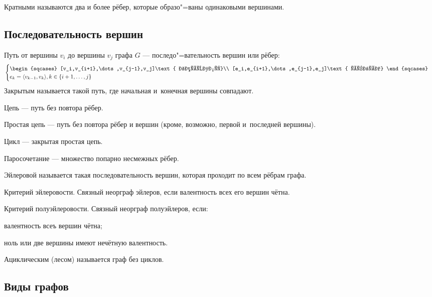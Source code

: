 {\bold Кратными} называются два и более рёбер, которые образо"=ваны {\ital одинаковыми} вершинами.

\subsection{Последовательность вершин}

{\bold Путь} от вершины $v_i$ до вершины $v_j$ графа $G$ --- последо"=вательность вершин или рёбер:
$$\begin{cases}
\begin{sqcases}
[v_i,v_{i+1},\dots,v_{j-1},v_j]\text{ вершины}\\
[e_i,e_{i+1},\dots,e_{j-1},e_j]\text{ рёбра}
\end{sqcases}\\
e_k=\langle v_{k-1},v_k\rangle,k\in\{i+1,\dots,j\}
\end{cases}$$
{\bold Закрытым} называется такой путь, где начальная и~конечная вершины совпадают.

{\bold Цепь} --- путь без повтора рёбер.

{\bold Простая цепь} --- путь без повтора рёбер и вершин {\ital\color{desc} (кроме, возможно, первой и~последней вершины)}.

{\bold Цикл} --- закрытая простая цепь.

{\bold Паросочетание} --- множество попарно несмежных рёбер.

{\bold Эйлеровой} называется такая последовательность вершин, которая проходит по всем {\ital рёбрам} графа.
\begin{theorem}
{\bold Критерий эйлеровости.} Связный неорграф {\ital эйлеров}, если валентность всех его вершин чётна. 
\end{theorem}
\begin{theorem}
{\bold Критерий полуэйлеровости.} Связный неорграф {\ital полуэйлеров}, если:

\begin{list*}
\item валентность всеъ вершин {\ital чётна};
\item ноль или две вершины имеют {\ital нечётную} валентность.
\end{list*}
\end{theorem}
{\bold Ациклическим {\ital (лесом)}} называется граф без циклов.

\subsection{Виды графов}

